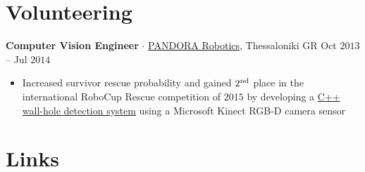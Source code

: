\documentclass[a4paper,10pt,twoside]{article}
\begin{document}
\section{\textbf{Volunteering}}\verticalspacebetweensectionandcontent

\noindent \textbf{Computer Vision Engineer} $\cdot$ \href{https://issel.ee.auth.gr/pandora-robotics/}{PANDORA Robotics}, Thessaloniki GR \hfill {\small \textcolor{agray}{Oct $2013$ -- Jul $2014$}}
  \begin{minipage}[t]{\textwidth}
    \begin{itemize}
      \item Increased survivor rescue probability and gained $2^{\textnormal{nd}}$ place in the international RoboCup Rescue competition of $2015$ by developing a \href{https://github.com/li9i/pandora\_vision\_2014}{C++ wall-hole detection system} using a Microsoft Kinect RGB-D camera sensor
    \end{itemize}
  \end{minipage}
\verticalspacebetweensections

\section{\textbf{Links}}\verticalspacebetweensectionandcontent
\end{document}
